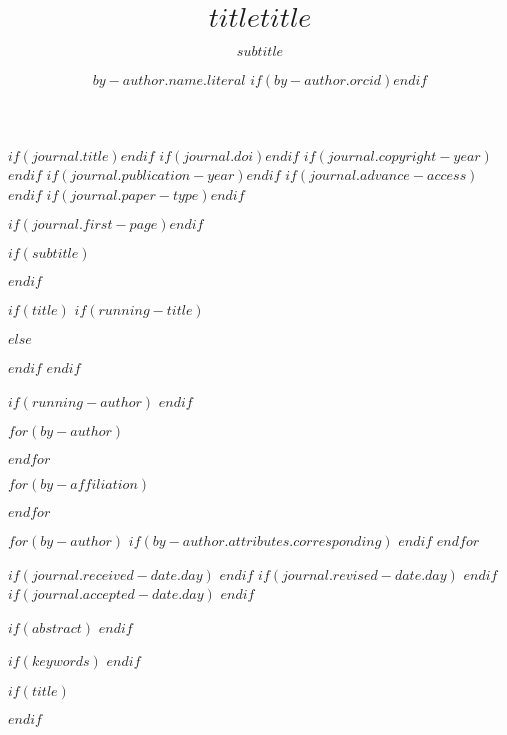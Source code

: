 
$if(journal.title)$$endif$
$if(journal.doi)$$endif$
$if(journal.copyright-year)$$endif$
$if(journal.publication-year)$$endif$
$if(journal.advance-access)$$endif$
$if(journal.paper-type)$$endif$

$if(journal.first-page)$$endif$

$if(subtitle)$\subtitle{$subtitle$}$endif$

$if(title)$
$if(running-title)$
\title[$running-title$]{$title$}
$else$
\title[$title$]{$title$}
$endif$
$endif$

$if(running-author)$
$endif$

$for(by-author)$
\author[$if(by-author.affiliations)$$for(by-author.affiliations)$$it.id$$sep$,$endfor$$endif$%
$if(by-author.attributes.corresponding)$,%
$$\ast$$%
$endif$%
]{$by-author.name.literal$ $if(by-author.orcid)$$endif$}
$endfor$

$for(by-affiliation)$
\address[$it.id$]{$_affiliation.tex()$}
$endfor$

$for(by-author)$
$if(by-author.attributes.corresponding)$
$endif$
$endfor$

$if(journal.received-date.day)$
$endif$
$if(journal.revised-date.day)$
$endif$
$if(journal.accepted-date.day)$
$endif$

$if(abstract)$
$endif$

$if(keywords)$
$endif$

$if(title)$
\maketitle
$endif$


